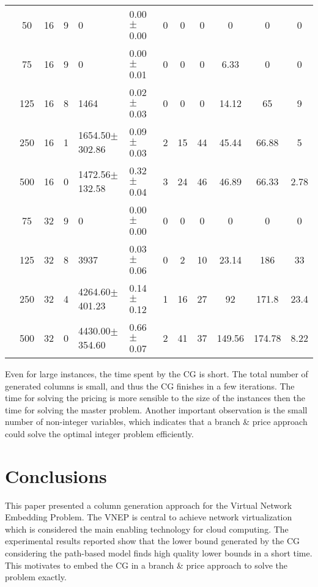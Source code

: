 \documentclass[article]{llncs}
\begin{document}
\begin{table}[h]
\begin{center}
\begin{tabular}{c c c c l l c c c c c c}
 &50      &  16  &    9  &  0                   &        0.00$\pm$0.00  &  0  &          0   &            0   &         0       &       0       &  0       \\
 &75      &  16  &    9  &  0                   &        0.00$\pm$0.01  &  0  &          0   &            0   &         6.33    &       0       &  0       \\
 &125     &  16  &    8  &  1464                &        0.02$\pm$0.03  &  0  &          0   &            0   &         14.12   &       65      &  9       \\
 &250     &  16  &    1  &  1654.50$\pm$302.86  &        0.09$\pm$0.03  &  2  &          15  &            44  &         45.44   &       66.88   &  5       \\
 &500     &  16  &    0  &  1472.56$\pm$132.58  &        0.32$\pm$0.04  &  3  &          24  &            46  &         46.89   &       66.33   &  2.78    \\
 &75      &  32  &    9  &  0                   &        0.00$\pm$0.00  &  0  &          0   &            0   &         0       &       0       &  0       \\
 &125     &  32  &    8  &  3937                &        0.03$\pm$0.06  &  0  &          2   &            10  &         23.14   &       186     &  33      \\
 &250     &  32  &    4  &  4264.60$\pm$401.23  &        0.14$\pm$0.12  &  1  &          16  &            27  &         92      &       171.8   &  23.4    \\
 &500     &  32  &    0  &  4430.00$\pm$354.60  &        0.66$\pm$0.07  &  2  &          41  &            37  &         149.56  &       174.78  &  8.22    \\

\end{tabular}
\end{center}
\end{table}

Even for large instances, the time spent by the CG is short. 
The total number of generated columns is small, and thus the CG finishes in a few iterations.
The time for solving the pricing is more sensible to the size of the instances then the time for solving the master problem.
Another important observation is the small number of non-integer variables, which indicates that a branch \& price approach
could solve the optimal integer problem efficiently.

\section{Conclusions}
\label{sec:conclusion}
This paper presented a column generation approach for the 
Virtual Network Embedding Problem. 
The VNEP is central to achieve network virtualization which is considered the main enabling technology for cloud computing.
The experimental results reported show that the lower bound generated by the CG considering the path-based model
finds high quality lower bounds in a short time. This motivates to embed the CG in a branch \& price approach to solve the problem exactly.
\end{document}
